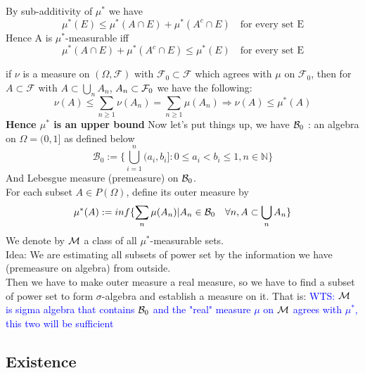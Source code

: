 \begin{rem}
By sub-additivity of $\mu^*$ we have 
\begin{equation*}
    \mu^*(E) \leq \mu^*(A\cap E) + \mu^*(A^c \cap E)   \quad \text{for every set E}
\end{equation*} Hence A is $\mu^*$-measurable iff
\begin{equation*}
    \mu^*(A\cap E) + \mu^*(A^c \cap E) \leq \mu^*(E) \quad \text{for every set E}
\end{equation*}
\end{rem}
if $\nu$ is a measure on $(\Omega, \mathcal{F})$ with $\mathcal{F}_0 \subset \mathcal{F}$ which agrees with $\mu$ on $\mathcal{F}_0$, then for $A\subset\mathcal{F}$ with $A\subset \bigcup\limits_{n}A_n$, $A_n \subset \mathcal{F}_0$ we have the following: 
\begin{equation*}
    \nu(A) \leq \sum\limits_{n \geq 1} \nu(A_n) = \sum\limits_{n \geq 1} \mu(A_n) \Rightarrow \nu(A) \leq \mu^*(A)
\end{equation*}
\textbf{Hence $\mu^*$ is an upper bound}
\newpage
Now let's put things up, we have $\mathcal{B}_0$ : an algebra on $\Omega = (0,1]$ as defined below
\begin{equation*}
    \mathcal{B}_0:= \{\bigcup\limits_{i=1}^n (a_i, b_i]: 0\leq a_i < b_i \leq 1, n\in \mathbb{N} \}
\end{equation*}
And Lebesgue measure (premeasure) on $\mathcal{B}_0$. \\[1cm]
For each subset $A \in P(\Omega)$, define its outer measure by
\begin{equation*}
    \mu^*(A) := inf\{\sum\limits_{n} \mu(A_n)|A_n \in \mathcal{B}_0 \quad \forall n, A\subset \bigcup\limits_{n}A_n\}
\end{equation*}
We denote by $\mathcal{M}$ a class of all $\mu^*$-measurable sets. \\[1cm]
Idea: We are estimating all subsets of power set by the information we have (premeasure on algebra) from outside. \\
Then we have to make outer measure a real measure, so we have to find a subset of power set to form $\sigma$-algebra and establish a measure on it. That is:
\textcolor{blue}{WTS: $\mathcal{M}$ is sigma algebra that contains $\mathcal{B}_0$ and the "real" measure $\mu$ on $\mathcal{M}$ agrees with $\mu^*$, this two will be sufficient}
\newpage
\subsection{Existence}
\begin{lem}
\end{lem}

